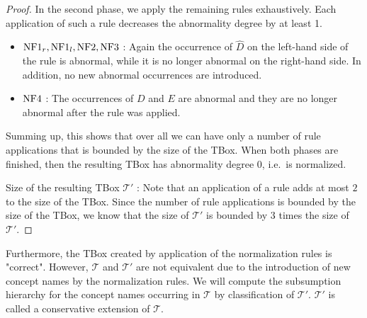 \begin{proof}
		In the second phase, we apply the remaining rules exhaustively.
		Each application of such a rule decreases the abnormality degree by at least 1.
		\begin{itemize}
			\item $\mathit{\text{NF1}}_r, \mathit{\text{NF1}}_l, \mathit{\text{NF2}}, \mathit{\text{NF3}}$ : Again the occurrence of $\widehat{D}$ on the left-hand side
				of the rule is abnormal, while it is no longer abnormal on the right-hand side.
				In addition, no new abnormal occurrences are introduced.
			\item $\mathit{\text{NF4}}$ : The occurrences of $D$ and $E$ are abnormal
				and they are no longer abnormal after the rule was applied.
		\end{itemize}
		Summing up, this shows that over all we can have only a number of rule applications that is bounded by the size of the TBox.
		When both phases are finished, then the resulting TBox has abnormality degree $0$, i.e.\ is normalized.

		Size of the resulting TBox $\mathcal{T}'$ :
		Note that an application of a rule adds at most $2$ to the size of the TBox.
		Since the number of rule applications is bounded by the size of the TBox, we know that the size of $\mathcal{T}'$ 
		is bounded by $3$ times the size of $\mathcal{T}'$.
\end{proof}

Furthermore, the TBox created by application of the normalization rules is "correct".
However, $\mathcal{T}$ and $\mathcal{T}'$ are not equivalent due to the introduction of new concept names by the normalization rules.
We will compute the subsumption hierarchy for the concept names occurring in $\mathcal{T}$ by classification of $\mathcal{T}'$.
$\mathcal{T}'$ is called a conservative extension of $\mathcal{T}$.

